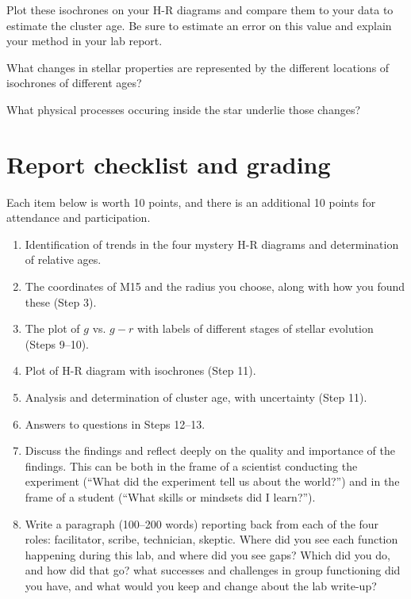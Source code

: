 \begin{steps}
	\item Plot these isochrones on your H-R diagrams and compare them to your data to estimate the cluster age. Be sure to estimate an error on this value and explain your method in your lab report.
	
	\item What changes in stellar properties are represented by the different locations of isochrones of different ages?
	
	\item What physical processes occuring inside the star underlie those changes?
\end{steps}

\section{Report checklist and grading}

Each item below is worth 10 points, and there is an additional 10 points for attendance and participation.

\begin{enumerate}
	\item Identification of trends in the four mystery H-R diagrams and determination of relative ages.

	\item The coordinates of M15 and the radius you choose, along with how you found these (Step 3).
	
	\item The plot of $g$ vs. $g-r$ with labels of different stages of stellar evolution (Steps 9--10).
	
	\item Plot of H-R diagram with isochrones (Step 11).
	
	\item Analysis and determination of cluster age, with uncertainty (Step 11).
	
	\item Answers to questions in Steps 12--13.
	
	\item Discuss the findings and reflect deeply on the quality and importance of the findings. This can be both in the frame of a scientist conducting the experiment (“What did the experiment tell us about the world?”) and in the frame of a student (“What skills or mindsets did I learn?”).
	
	\item Write a paragraph (100--200 words) reporting back from each of the four roles: facilitator, scribe, technician, skeptic. Where did you see each function happening during this lab, and where did you see gaps? Which did you do, and how did that go? what successes and	challenges in group functioning did you have, and what would you keep and change about the lab write-up?
\end{enumerate}
